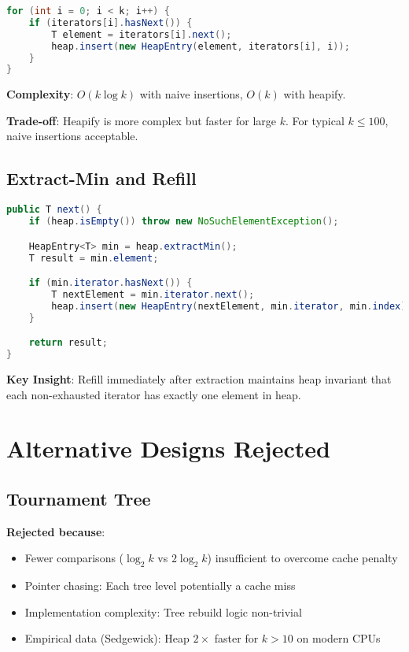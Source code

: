 \documentclass[11pt]{article}
\begin{document}
\begin{lstlisting}[language=Java, basicstyle=\small\ttfamily]
for (int i = 0; i < k; i++) {
    if (iterators[i].hasNext()) {
        T element = iterators[i].next();
        heap.insert(new HeapEntry(element, iterators[i], i));
    }
}
\end{lstlisting}

\textbf{Complexity}: $O(k \log k)$ with naive insertions, $O(k)$ with heapify.

\textbf{Trade-off}: Heapify is more complex but faster for large $k$. For typical $k \leq 100$, naive insertions acceptable.

\subsection{Extract-Min and Refill}

\begin{lstlisting}[language=Java, basicstyle=\small\ttfamily]
public T next() {
    if (heap.isEmpty()) throw new NoSuchElementException();

    HeapEntry<T> min = heap.extractMin();
    T result = min.element;

    if (min.iterator.hasNext()) {
        T nextElement = min.iterator.next();
        heap.insert(new HeapEntry(nextElement, min.iterator, min.index));
    }

    return result;
}
\end{lstlisting}

\textbf{Key Insight}: Refill immediately after extraction maintains heap invariant that each non-exhausted iterator has exactly one element in heap.

\section{Alternative Designs Rejected}

\subsection{Tournament Tree}

\textbf{Rejected because}:
\begin{itemize}
    \item Fewer comparisons ($\log_2 k$ vs $2 \log_2 k$) insufficient to overcome cache penalty
    \item Pointer chasing: Each tree level potentially a cache miss
    \item Implementation complexity: Tree rebuild logic non-trivial
    \item Empirical data (Sedgewick): Heap $2\times$ faster for $k > 10$ on modern CPUs
\end{itemize}
\end{document}
